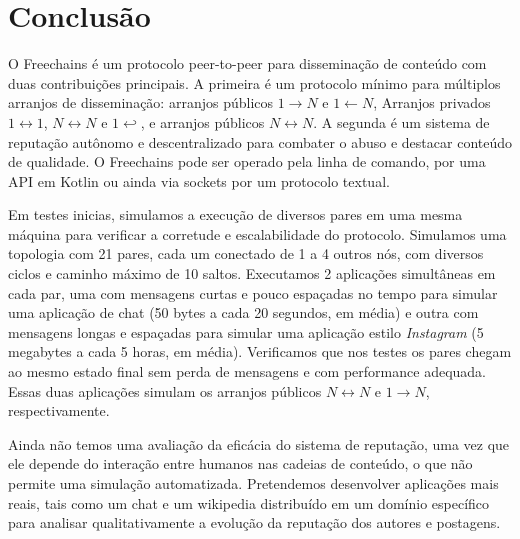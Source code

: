 \documentclass[12pt]{article}
\newcommand{\FC} {Freechains\xspace}
\newcommand{\Xon} {$1{\rightarrow}N$\xspace}
\newcommand{\Xno} {$1{\leftarrow}N$\xspace}
\newcommand{\Xnn} {$N{\leftrightarrow}N$\xspace}
\newcommand{\Xoo} {$1{\leftrightarrow}1$\xspace}
\newcommand{\Xo}  {$1{\hookleftarrow}$\xspace}
\begin{document}
\section{Conclusão}
\label{sec.conclusion}

O \FC é um protocolo peer-to-peer para disseminação de conteúdo com duas
contribuições principais.
A primeira é um protocolo mínimo para múltiplos arranjos de disseminação:
arranjos públicos \Xon e \Xno, Arranjos privados \Xoo, \Xnn e \Xo, e arranjos
públicos \Xnn.
A segunda é um sistema de reputação autônomo e descentralizado para combater
o abuso e destacar conteúdo de qualidade.
O \FC pode ser operado pela linha de comando, por uma API em Kotlin ou ainda
via sockets por um protocolo textual.

Em testes inicias, simulamos a execução de diversos pares em uma mesma máquina
para verificar a corretude e escalabilidade do protocolo.
Simulamos uma topologia com 21 pares, cada um conectado de 1 a 4 outros nós,
com diversos ciclos e caminho máximo de 10 saltos.
Executamos 2 aplicações simultâneas em cada par, uma com mensagens curtas e
pouco espaçadas no tempo para simular uma aplicação de chat (50 bytes a cada 20
segundos, em média) e outra com mensagens longas e espaçadas para simular uma
aplicação estilo \emph{Instagram} (5 megabytes a cada 5 horas, em média).
Verificamos que nos testes os pares chegam ao mesmo estado final sem perda de
mensagens e com performance adequada.
Essas duas aplicações simulam os arranjos públicos \Xnn e \Xon,
respectivamente.

Ainda não temos uma avaliação da eficácia do sistema de reputação, uma vez que
ele depende do interação entre humanos nas cadeias de conteúdo, o que não
permite uma simulação automatizada.
Pretendemos desenvolver aplicações mais reais, tais como um chat e um wikipedia
distribuído em um domínio específico para analisar qualitativamente a evolução
da reputação dos autores e postagens.



\end{document}
